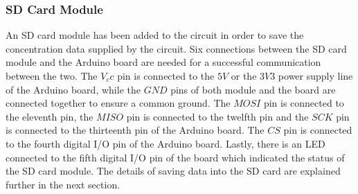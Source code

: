 \subsubsection{SD Card Module}
An SD card module has been added to the circuit in order to save the concentration data supplied by the circuit. Six connections between the SD card module and the Arduino board are needed for a successful communication between the two. The $V_cc$ pin is connected to the $5V$ or the $3V3$ power supply line of the Arduino board, while the $GND$ pins of both module and the board are connected together to ensure a common ground. The $MOSI$ pin is connected to the eleventh pin, the $MISO$ pin is connected to the twelfth pin and the $SCK$ pin is connected to the thirteenth pin of the Arduino board. The $CS$ pin is connected to the fourth digital I/O pin of the Arduino board. Lastly, there is an LED connected to the fifth digital I/O pin of the board which indicated the status of the SD card module. The details of saving data into the SD card are explained further in the next section. 


